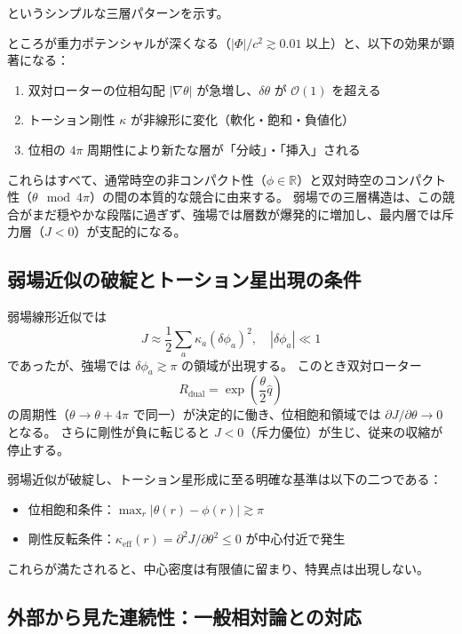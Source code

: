 \documentclass[dvipdfmx,a4paper]{jsbook}
\theoremstyle{definition}
\theoremstyle{remark}
\begin{document}
というシンプルな三層パターンを示す。

ところが重力ポテンシャルが深くなる（$|\Phi|/c^2 \gtrsim 0.01$ 以上）と、以下の効果が顕著になる：

\begin{enumerate}
  \item 双対ローターの位相勾配 $|\nabla \theta|$ が急増し、$\delta\theta$ が $\mathcal{O}(1)$ を超える
  \item トーション剛性 $\kappa$ が非線形に変化（軟化・飽和・負値化）
  \item 位相の $4\pi$ 周期性により新たな層が「分岐」・「挿入」される
\end{enumerate}

これらはすべて、通常時空の非コンパクト性（$\phi \in \mathbb{R}$）と双対時空のコンパクト性（$\theta \mod 4\pi$）の間の本質的な競合に由来する。
弱場での三層構造は、この競合がまだ穏やかな段階に過ぎず、強場では層数が爆発的に増加し、最内層では斥力層（$J < 0$）が支配的になる。

\subsection{弱場近似の破綻とトーション星出現の条件}

弱場線形近似では
\[
J \approx \frac{1}{2} \sum_a \kappa_a (\delta\phi_a)^2, \quad |\delta\phi_a| \ll 1
\]
であったが、強場では $\delta\phi_a \gtrsim \pi$ の領域が出現する。
このとき双対ローター
\[
R_\text{dual} = \exp\!\left( \frac{\theta}{2} \hat{q} \right)
\]
の周期性（$\theta \to \theta + 4\pi$ で同一）が決定的に働き、位相飽和領域では $\partial J/\partial\theta \to 0$ となる。
さらに剛性が負に転じると $J < 0$（斥力優位）が生じ、従来の収縮が停止する。

弱場近似が破綻し、トーション星形成に至る明確な基準は以下の二つである：

\begin{itemize}
  \item 位相飽和条件：$\max_r |\theta(r) - \phi(r)| \gtrsim \pi$
  \item 剛性反転条件：$\kappa_\text{eff}(r) = \partial^2 J / \partial \theta^2 \leq 0$ が中心付近で発生
\end{itemize}

これらが満たされると、中心密度は有限値に留まり、特異点は出現しない。

\subsection{外部から見た連続性：一般相対論との対応}
\end{document}
